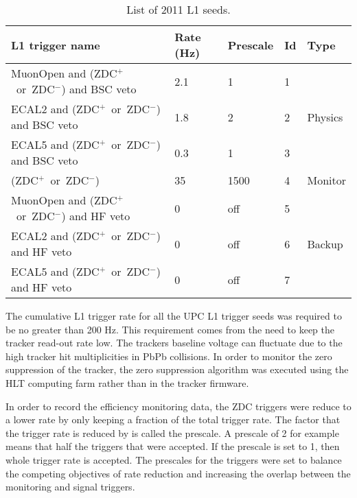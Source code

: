     \begin{table}[h]
      \centering
      \begin{tabular}{|l|l|l|l|l|}
        \hline L1 trigger name & Rate (Hz) & Prescale & Id & Type \\ \hline \hline
        MuonOpen and (ZDC$^{+}$~or~ZDC$^{-}$) and BSC veto & 2.1 & 1 & 1 & \multirow{3}{*}{Physics} \\  \hhline{----~}
        ECAL2 and (ZDC$^{+}$~or~ZDC$^{-}$) and BSC veto & 1.8 & 2 & 2 & \\  \hhline{----~}
        ECAL5 and (ZDC$^{+}$~or~ZDC$^{-}$) and BSC veto & 0.3 & 1 & 3 & \\  \hline
        (ZDC$^{+}$~or~ZDC$^{-}$) & 35 & 1500 & 4 & Monitor \\  \hline
        MuonOpen and (ZDC$^{+}$~or~ZDC$^{-}$) and HF veto & 0 & off & 5 & \multirow{3}{*}{Backup} \\ \hhline{----~}
        ECAL2 and (ZDC$^{+}$~or~ZDC$^{-}$) and HF veto & 0 & off & 6 & \\  \hhline{----~}
        ECAL5 and (ZDC$^{+}$~or~ZDC$^{-}$) and HF veto & 0 & off & 7 & \\  \hline
      \end{tabular}
      \caption{List of 2011 L1 seeds.}
      \label{tab:l1Triggers2011}
    \end{table}
    The cumulative L1 trigger rate for all the UPC L1 trigger seeds was
      required to be no greater than 200 Hz.
    This requirement comes from the need to keep the tracker read-out rate
      low. 
    The trackers baseline voltage can fluctuate due to the high tracker hit 
      multiplicities in PbPb collisions.
    In order to monitor the zero suppression of the tracker, the zero 
      suppression algorithm was executed using the HLT computing farm 
	      rather than in the tracker firmware.

    In order to record the efficiency monitoring data, the ZDC triggers were
      reduce to a lower rate by only keeping a fraction of the total trigger 
      rate. 
    The factor that the trigger rate is reduced by is called the prescale.
    A prescale of 2 for example means that half the triggers that were 
      accepted.
    If the prescale is set to 1, then whole trigger rate is accepted. 
    The prescales for the triggers were set to balance the competing objectives 
      of rate reduction and increasing the overlap between the monitoring and
      signal triggers.

